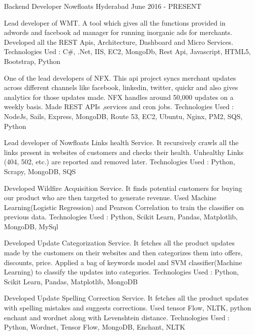 

\begin{cventries}

  \cventry
    {Backend Developer} %
    {Nowfloats} %
    {Hyderabad} %
    {June 2016 - PRESENT} %
    {
      \begin{cvitems} %
        \item {Lead developer of WMT. A tool which gives all the functions provided in adwords and facebook ad manager for running inorganic ads for merchants. Developed all the REST Apis, Architecture, Dashboard and Micro Services. Technologies Ued : C\#, .Net, IIS, EC2, MongoDb, Rest Api, Javascript, HTML5, Bootstrap, Python}
        \item {One of the lead developers of NFX. This api project syncs merchant updates across different channels like facebook, linkedin, twitter, quickr and also gives analytics for those updates made. NFX handles around 50,000 updates on a weekly basis. Made REST APIs ,services and cron jobs. Technologies Used : NodeJs, Sails, Express, MongoDB, Route 53, EC2, Ubuntu, Nginx, PM2, SQS, Python}
        \item {Lead developer of Nowfloats Links health Service. It recursively crawls all the links present in websites of customers and checks their health. Unhealthy Links (404, 502, etc.) are reported and removed later. Technologies Used : Python, Scrapy, MongoDB, SQS  }
        \item {Developed Wildfire Acquisition Service. It finds potential customers for buying our product who are then targeted to generate revenue. Used Machine Learning(Logistic Regression) and Pearson Correlation to train the classifier on previous data. Technologies Used : Python, Scikit Learn, Pandas, Matplotlib, MongoDB, MySql  }
        \item {Developed Update Categorization Service. It fetches all the product updates made by the customers on their websites and then categorizes them into offers, discounts, price. Applied a bag of keywords model and SVM classifier(Machine Learning) to classify the updates into categories. Technologies Used : Python, Scikit Learn, Pandas, Matplotlib, MongoDB  }
        \item {Developed Update Spelling Correction Service. It fetches all the product updates with spelling mistakes and suggests corrections. Used tensor Flow, NLTK, python enchant and wordnet along with Levenshtein distance. Technologies Used : Python, Wordnet, Tensor Flow, MongoDB, Enchant, NLTK  }
      \end{cvitems}
    }


\end{cventries}
